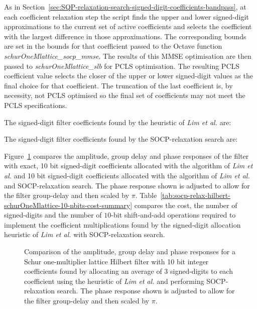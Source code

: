 \documentclass[a4paper,twoside,10pt,english]{report}
\begin{document}
As in Section~\ref{sec:SQP-relaxation-search-signed-digit-coefficients-bandpass},
at each coefficient relaxation step the script finds the upper and lower
signed-digit approximations to the current set of active coefficients and
selects the coefficient with the largest difference in those approximations. The
corresponding bounds are set in the bounds for that coefficient passed to the
Octave function \emph{schurOneMlattice\_socp\_mmse}. The results of this MMSE
optimisation are then passed to \emph{schurOneMlattice\_slb} for PCLS
optimisation. The resulting PCLS coefficient value selects the closer of the
upper or lower signed-digit values as the final choice for that coefficient. The
truncation of the last coefficient is, by necessity, not PCLS optimised so the
final set of coefficients may not meet the PCLS specifications.

The signed-digit filter coefficients found by the heuristic of 
\emph{Lim et al.} are:
\begin{small}


\end{small}

The signed-digit filter coefficients found by the SOCP-relaxation search are:
\begin{small}


\end{small}

Figure~\ref{fig:socp-relax-hilbert-schurOneMlattice-10-nbits-response}
compares the amplitude, group delay and phase responses of the filter with
exact, 10 bit signed-digit coefficients allocated with the algorithm of
\emph{Lim et al.} and 10 bit signed-digit coefficients allocated with the
algorithm of \emph{Lim et al.} and SOCP-relaxation search. The phase response
shown is adjusted to allow for the filter group-delay and then scaled by
$\pi$.
Table~\ref{tab:socp-relax-hilbert-schurOneMlattice-10-nbits-cost-summary}
compares the cost, the number of signed-digits and the number of $10$-bit
shift-and-add operations required to implement the coefficient multiplications
found by the signed-digit allocation heuristic of \emph{Lim et al.} with
SOCP-relaxation search.

\begin{figure}[!htbp]
\begin{center}
\scalebox{0.7}{}
\caption{Comparison of the amplitude, group delay and phase responses for a
  Schur one-multiplier lattice Hilbert filter with 10 bit integer coefficients
  found by allocating an average of 3 signed-digits to each coefficient using
  the heuristic of \emph{Lim et al.} and performing SOCP-relaxation
  search. The phase response shown is adjusted to allow for the filter
  group-delay and then scaled by $\pi$.}
\label{fig:socp-relax-hilbert-schurOneMlattice-10-nbits-response}
\end{center}
\end{figure}
\end{document}
